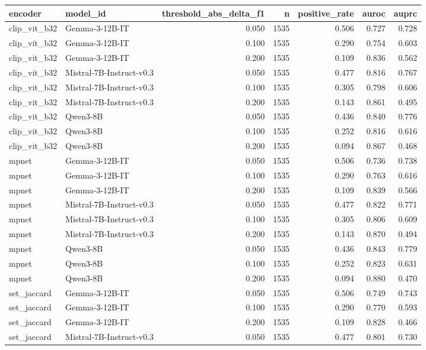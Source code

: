 \begin{tabular}{llrrrrr}
\toprule
encoder & model\_id & threshold\_abs\_delta\_f1 & n & positive\_rate & auroc & auprc \\
\midrule
clip\_vit\_b32 & Gemma-3-12B-IT & 0.050 & 1535 & 0.506 & 0.727 & 0.728 \\
clip\_vit\_b32 & Gemma-3-12B-IT & 0.100 & 1535 & 0.290 & 0.754 & 0.603 \\
clip\_vit\_b32 & Gemma-3-12B-IT & 0.200 & 1535 & 0.109 & 0.836 & 0.562 \\
clip\_vit\_b32 & Mistral-7B-Instruct-v0.3 & 0.050 & 1535 & 0.477 & 0.816 & 0.767 \\
clip\_vit\_b32 & Mistral-7B-Instruct-v0.3 & 0.100 & 1535 & 0.305 & 0.798 & 0.606 \\
clip\_vit\_b32 & Mistral-7B-Instruct-v0.3 & 0.200 & 1535 & 0.143 & 0.861 & 0.495 \\
clip\_vit\_b32 & Qwen3-8B & 0.050 & 1535 & 0.436 & 0.840 & 0.776 \\
clip\_vit\_b32 & Qwen3-8B & 0.100 & 1535 & 0.252 & 0.816 & 0.616 \\
clip\_vit\_b32 & Qwen3-8B & 0.200 & 1535 & 0.094 & 0.867 & 0.468 \\
mpnet & Gemma-3-12B-IT & 0.050 & 1535 & 0.506 & 0.736 & 0.738 \\
mpnet & Gemma-3-12B-IT & 0.100 & 1535 & 0.290 & 0.763 & 0.616 \\
mpnet & Gemma-3-12B-IT & 0.200 & 1535 & 0.109 & 0.839 & 0.566 \\
mpnet & Mistral-7B-Instruct-v0.3 & 0.050 & 1535 & 0.477 & 0.822 & 0.771 \\
mpnet & Mistral-7B-Instruct-v0.3 & 0.100 & 1535 & 0.305 & 0.806 & 0.609 \\
mpnet & Mistral-7B-Instruct-v0.3 & 0.200 & 1535 & 0.143 & 0.870 & 0.494 \\
mpnet & Qwen3-8B & 0.050 & 1535 & 0.436 & 0.843 & 0.779 \\
mpnet & Qwen3-8B & 0.100 & 1535 & 0.252 & 0.823 & 0.631 \\
mpnet & Qwen3-8B & 0.200 & 1535 & 0.094 & 0.880 & 0.470 \\
set\_jaccard & Gemma-3-12B-IT & 0.050 & 1535 & 0.506 & 0.749 & 0.743 \\
set\_jaccard & Gemma-3-12B-IT & 0.100 & 1535 & 0.290 & 0.770 & 0.593 \\
set\_jaccard & Gemma-3-12B-IT & 0.200 & 1535 & 0.109 & 0.828 & 0.466 \\
set\_jaccard & Mistral-7B-Instruct-v0.3 & 0.050 & 1535 & 0.477 & 0.801 & 0.730 \\

\end{tabular}
